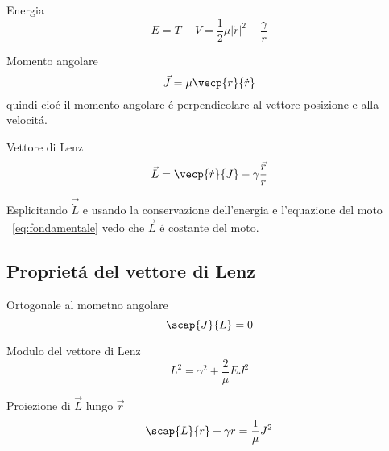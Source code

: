 \begin{enumerate*}

\item Energia\\
\begin{equation*}
E=T+V=\frac{1}{2}\mu|\dot{r}|^2-\frac{\gamma}{r}
\end{equation*}

\item Momento angolare\\
\begin{equation*}
\vec{J}=\mu\vecp{r}{\dot{r}}
\end{equation*}
quindi  cio\'e il momento angolare \'e perpendicolare al vettore posizione e alla velocit\'a.


\item Vettore di Lenz\\
\begin{equation*}\label{eq:lenzv}
\vec{L}=\vecp{\dot{r}}{J}-\gamma\frac{\vec{r}}{r}
\end{equation*}




\end{enumerate*}

Esplicitando $\vec{\dot{L}}$ e usando la conservazione dell'energia e l'equazione del moto ~\ref{eq:fondamentale} vedo che $\vec{L}$ \'e costante del moto.

\subsection{Propriet\'a del vettore di Lenz}

\begin{itemize*}
\item Ortogonale al mometno angolare
\begin{equation*}\label{eq:JLzero}
\scap{J}{L}=0
\end{equation*}

\item Modulo del vettore di Lenz
\begin{equation*}\label{eq:moduloL}
L^2=\gamma^2+\frac{2}{\mu}EJ^2
\end{equation*}

\item Proiezione di $\vec{L}$ lungo $\vec{r}$
\begin{equation*}\label{eq:Lr}
\scap{L}{r}+\gamma r=\frac{1}{\mu}J^2
\end{equation*}
\end{itemize*}

